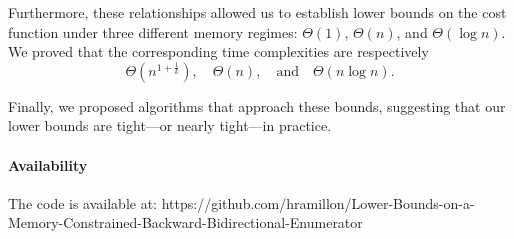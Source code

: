 \documentclass[a4paper,10pt]{article}
\begin{document}
Furthermore, these relationships allowed us to establish lower bounds on the cost function under three different memory regimes: $\Theta(1)$, $\Theta(n)$, and $\Theta(\log n)$. We proved that the corresponding time complexities are respectively
\[
\Theta\left(n^{1 + \frac{1}{k}}\right), \quad \Theta(n), \quad \text{and} \quad \Theta(n \log n).
\]

Finally, we proposed algorithms that approach these bounds, suggesting that our lower bounds are tight—or nearly tight—in practice.

\paragraph{Availability}
The code is available at:
https://github.com/hramillon/Lower-Bounds-on-a-Memory-Constrained-Backward-Bidirectional-Enumerator



\end{document}
